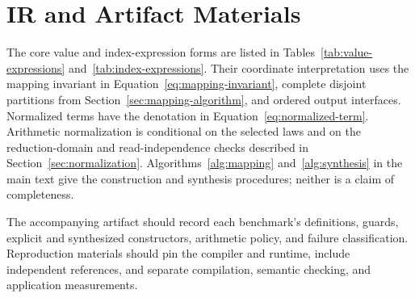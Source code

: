 \FloatBarrier
\section{IR and Artifact Materials}
\label{sec:artifact}
The core value and index-expression forms are listed in
Tables~\ref{tab:value-expressions} and~\ref{tab:index-expressions}. Their
coordinate interpretation uses the mapping invariant in
Equation~\eqref{eq:mapping-invariant}, complete disjoint partitions from
Section~\ref{sec:mapping-algorithm}, and ordered output interfaces. Normalized
terms have the denotation in Equation~\eqref{eq:normalized-term}. Arithmetic
normalization is conditional on the selected laws and on the reduction-domain
and read-independence checks described in Section~\ref{sec:normalization}.
Algorithms~\ref{alg:mapping} and~\ref{alg:synthesis} in the main text give the construction and synthesis
procedures; neither is a claim of completeness.

The accompanying artifact should record each benchmark's definitions, guards,
explicit and synthesized constructors, arithmetic policy, and failure
classification. Reproduction materials should pin the compiler and runtime,
include independent references, and separate compilation, semantic checking,
and application measurements. 
